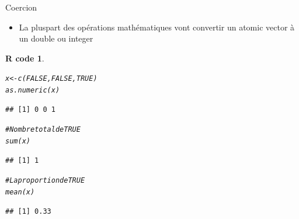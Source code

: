 \documentclass[11pt]{beamer}\usepackage[]{graphicx}\usepackage[]{color}
\makeatletter
\newcommand{\hlnum}[1]{\textcolor[rgb]{0.063,0.58,0.627}{#1}}%
\newcommand{\hlcom}[1]{\textcolor[rgb]{0.588,0.588,0.588}{#1}}%
\newcommand{\hlstd}[1]{\textcolor[rgb]{0.196,0.196,0.196}{#1}}%
\newcommand{\hlkwb}[1]{\textcolor[rgb]{0.627,0,0.314}{#1}}%
\newcommand{\hlkwd}[1]{\textcolor[rgb]{0.78,0.227,0.412}{#1}}%
\newenvironment{kframe}{%
 \def\at@end@of@kframe{}%
 \ifinner\ifhmode%
  \def\at@end@of@kframe{\end{minipage}}%
  \begin{minipage}{\columnwidth}%
 \fi\fi%
 \def\FrameCommand##1{\hskip\@totalleftmargin \hskip-\fboxsep
 \colorbox{shadecolor}{##1}\hskip-\fboxsep
     \hskip-\linewidth \hskip-\@totalleftmargin \hskip\columnwidth}%
 \MakeFramed {\advance\hsize-\width
   \@totalleftmargin\z@ \linewidth\hsize
   \@setminipage}}%
 {\par\unskip\endMakeFramed%
 \at@end@of@kframe}
\newenvironment{knitrout}{}{} %
\newtheorem{rcode}{R code}[section]
\makeatother
\begin{document}
\begin{frame}[fragile]{Coercion}
\begin{itemize}
\item La pluspart des opérations mathématiques vont convertir un atomic vector à un double ou integer
\end{itemize}
\begin{knitrout}\footnotesize
{}\color{fgcolor}\begin{kframe}
\begin{rcode}\label{unnamed-chunk-17}\begin{alltt}
\hlstd{x} \hlkwb{<-} \hlkwd{c}\hlstd{(}\hlnum{FALSE}\hlstd{,} \hlnum{FALSE}\hlstd{,} \hlnum{TRUE}\hlstd{)}
\hlkwd{as.numeric}\hlstd{(x)}
\end{alltt}
\begin{verbatim}
## [1] 0 0 1
\end{verbatim}
\begin{alltt}
\hlcom{# Nombre total de TRUE}
\hlkwd{sum}\hlstd{(x)}
\end{alltt}
\begin{verbatim}
## [1] 1
\end{verbatim}
\begin{alltt}
\hlcom{# La proportion de TRUE}
\hlkwd{mean}\hlstd{(x)}
\end{alltt}
\begin{verbatim}
## [1] 0.33
\end{verbatim}
\end{rcode}\end{kframe}
\end{knitrout}
\end{frame}
\end{document}
